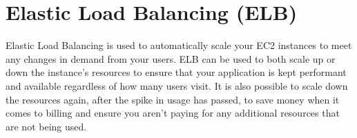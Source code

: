 \chapter{Elastic Load Balancing (ELB)}\label{ch:elastic-load-balancing}

Elastic Load Balancing is used to automatically scale your EC2 instances to meet any changes in demand from your users.
ELB can be used to both scale up or down the instance's resources to ensure that your application is kept performant and
available regardless of how many users visit.
It is also possible to scale down the resources again, after the spike in usage has passed, to save money when it comes
to billing and ensure you aren't paying for any additional resources that are not being used.



